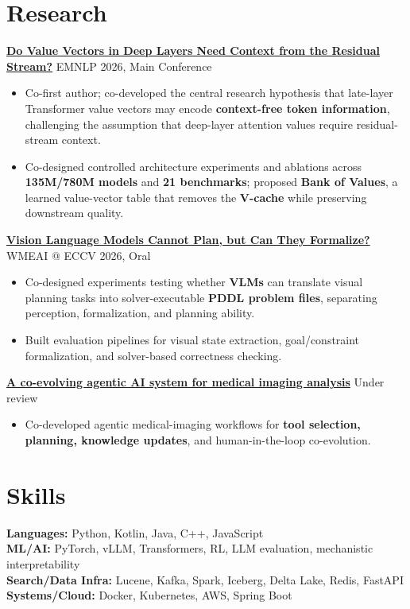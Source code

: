 \documentclass[10pt,letterpaper]{article}
\begin{document}
\section*{Research}
\href{https://arxiv.org/abs/2606.02780}{\textbf{Do Value Vectors in Deep Layers Need Context from the Residual Stream?}} \hfill EMNLP 2026, Main Conference\\
\begin{itemize}
  \item Co-first author; co-developed the central research hypothesis that late-layer Transformer value vectors may encode \textbf{context-free token information}, challenging the assumption that deep-layer attention values require residual-stream context.
  \item Co-designed controlled architecture experiments and ablations across \textbf{135M/780M models} and \textbf{21 benchmarks}; proposed \textbf{Bank of Values}, a learned value-vector table that removes the \textbf{V-cache} while preserving downstream quality.
\end{itemize}
\vspace{2pt}
\href{https://arxiv.org/abs/2509.21576}{\textbf{Vision Language Models Cannot Plan, but Can They Formalize?}} \hfill WMEAI @ ECCV 2026, Oral\\
\begin{itemize}
  \item Co-designed experiments testing whether \textbf{VLMs} can translate visual planning tasks into solver-executable \textbf{PDDL problem files}, separating perception, formalization, and planning ability.
  \item Built evaluation pipelines for visual state extraction, goal/constraint formalization, and solver-based correctness checking.
\end{itemize}
\vspace{2pt}
\href{https://arxiv.org/abs/2509.20279}{\textbf{A co-evolving agentic AI system for medical imaging analysis}} \hfill Under review\\
\begin{itemize}
  \item Co-developed agentic medical-imaging workflows for \textbf{tool selection, planning, knowledge updates}, and human-in-the-loop co-evolution.
\end{itemize}

\section*{Skills}
\textbf{Languages:} Python, Kotlin, Java, C++, JavaScript\\
\textbf{ML/AI:} PyTorch, vLLM, Transformers, RL, LLM evaluation, mechanistic interpretability\\
\textbf{Search/Data Infra:} Lucene, Kafka, Spark, Iceberg, Delta Lake, Redis, FastAPI\\
\textbf{Systems/Cloud:} Docker, Kubernetes, AWS, Spring Boot
\end{document}
